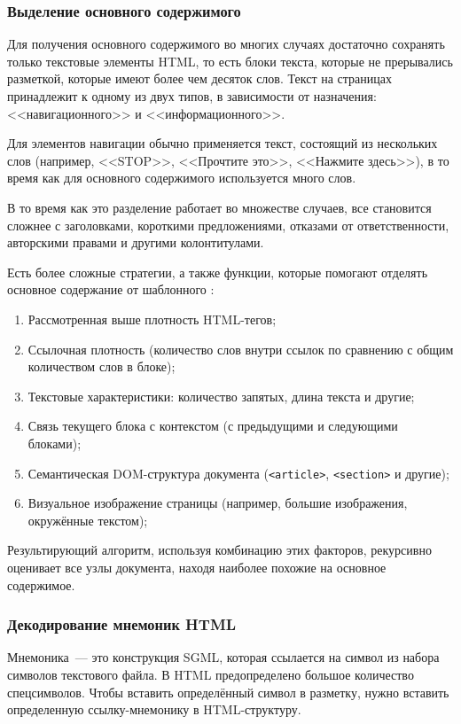 \subsubsection{Выделение основного содержимого} \label{sssec:readability}
Для получения основного содержимого во многих случаях достаточно сохранять только текстовые элементы HTML, то есть блоки текста, которые не прерывались разметкой, которые имеют более чем десяток слов. Текст на страницах принадлежит к одному из двух типов, в зависимости от назначения: <<навигационного>> и <<информационного>>.

Для элементов навигации обычно применяется текст, состоящий из нескольких слов (например, <<STOP>>, <<Прочтите это>>, <<Нажмите здесь>>), в то время как для основного содержимого используется много слов.

В то время как это разделение работает во множестве случаев, все становится сложнее с заголовками, короткими предложениями, отказами от ответственности, авторскими правами и другими колонтитулами.

Есть более сложные стратегии, а также функции, которые помогают отделять основное содержание от шаблонного \cite{kohlschutter10}:
\begin{enumerate}
    \item Рассмотренная выше плотность HTML-тегов;
    \item Ссылочная плотность (количество слов внутри ссылок по сравнению с общим количеством слов в блоке);
    \item Текстовые характеристики: количество запятых, длина текста и другие;
    \item Связь текущего блока с контекстом (с предыдущими и следующими блоками);
    \item Семантическая DOM-структура документа (\verb|<article>|, \verb|<section>| и другие);
    \item Визуальное изображение страницы (например, большие изображения, окружённые текстом);
\end{enumerate}

Результирующий алгоритм, используя комбинацию этих факторов, рекурсивно оценивает все узлы документа, находя наиболее похожие на основное содержимое.

\subsubsection{Декодирование мнемоник HTML} \label{sssec:html-mnemonics}
Мнемоника~--- это конструкция SGML, которая ссылается на символ из набора символов текстового файла. В HTML предопределено большое количество спецсимволов. Чтобы вставить определённый символ в разметку, нужно вставить определенную ссылку-мнемонику в HTML-структуру.

